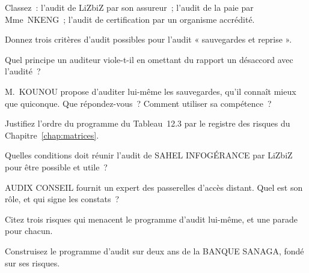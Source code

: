 \begin{boxexo}[title={\ding{45}\quad Exercice~12.1. Quel type~? \niveaubase}]
Classez~: l'audit de LiZbiZ par son assureur~; l'audit de la paie par
Mme~NKENG~; l'audit de certification par un organisme accrédité.
\end{boxexo}

\begin{boxexo}[title={\ding{45}\quad Exercice~12.2. Les critères \niveaubase}]
Donnez trois critères d'audit possibles pour l'audit « sauvegardes et
reprise ».
\end{boxexo}

\begin{boxexo}[title={\ding{45}\quad Exercice~12.3. Principes \niveaubase}]
Quel principe un auditeur viole-t-il en omettant du rapport un désaccord
avec l'audité~?
\end{boxexo}

\begin{boxexo}[title={\ding{45}\quad Exercice~12.4. Indépendance \niveaumoyen}]
M.~KOUNOU propose d'auditer lui-même les sauvegardes, qu'il connaît
mieux que quiconque. Que répondez-vous~? Comment utiliser sa compétence~?
\end{boxexo}

\begin{boxexo}[title={\ding{45}\quad Exercice~12.5. Fondé sur le risque \niveaumoyen}]
Justifiez l'ordre du programme du Tableau~12.3 par le registre des risques
du Chapitre~\ref{chap:matrices}.
\end{boxexo}

\begin{boxexo}[title={\ding{45}\quad Exercice~12.6. Le prestataire \niveaumoyen}]
Quelles conditions doit réunir l'audit de SAHEL INFOGÉRANCE par LiZbiZ
pour être possible et utile~?
\end{boxexo}

\begin{boxexo}[title={\ding{45}\quad Exercice~12.7. L'expert \niveaumoyen}]
AUDIX CONSEIL fournit un expert des passerelles d'accès distant. Quel est
son rôle, et qui signe les constats~?
\end{boxexo}

\begin{boxexo}[title={\ding{45}\quad Exercice~12.8. Les risques du programme \niveaumoyen}]
Citez trois risques qui menacent le programme d'audit lui-même, et une
parade pour chacun.
\end{boxexo}

\begin{boxexo}[title={\ding{45}\quad Exercice~12.9. Un programme bancaire \niveauexpert}]
Construisez le programme d'audit sur deux ans de la BANQUE SANAGA,
fondé sur ses risques.
\end{boxexo}

